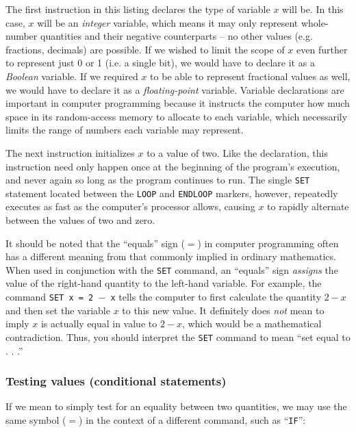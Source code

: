 \vskip 10pt

The first instruction in this listing declares the type of variable $x$ will be.  In this case, $x$ will be an \textit{integer} variable, which means it may only represent whole-number quantities and their negative counterparts -- no other values (e.g. fractions, decimals) are possible.  If we wished to limit the scope of $x$ even further to represent just 0 or 1 (i.e. a single bit), we would have to declare it as a \textit{Boolean} variable.  If we required $x$ to be able to represent fractional values as well, we would have to declare it as a \textit{floating-point} variable.  Variable declarations are important in computer programming because it instructs the computer how much space in its random-access memory to allocate to each variable, which necessarily limits the range of numbers each variable may represent.      

The next instruction initializes $x$ to a value of two.  Like the declaration, this instruction need only happen once at the beginning of the program's execution, and never again so long as the program continues to run.  The single \texttt{SET} statement located between the \texttt{LOOP} and \texttt{ENDLOOP} markers, however, repeatedly executes as fast as the computer's processor allows, causing $x$ to rapidly alternate between the values of two and zero.

It should be noted that the ``equals'' sign ($=$) in computer programming often has a different meaning from that commonly implied in ordinary mathematics.  When used in conjunction with the \texttt{SET} command, an ``equals'' sign \textit{assigns} the value of the right-hand quantity to the left-hand variable.  For example, the command \texttt{SET x = 2 $-$ x} tells the computer to first calculate the quantity $2 - x$ and then set the variable $x$ to this new value.  It definitely does \textit{not} mean to imply $x$ is actually equal in value to $2 - x$, which would be a mathematical contradiction.  Thus, you should interpret the \texttt{SET} command to mean ``set equal to . . .''



\filbreak
\subsubsection{Testing values (conditional statements)}

If we mean to simply test for an equality between two quantities, we may use the same symbol ($=$) in the context of a different command, such as ``\texttt{IF}'':  

